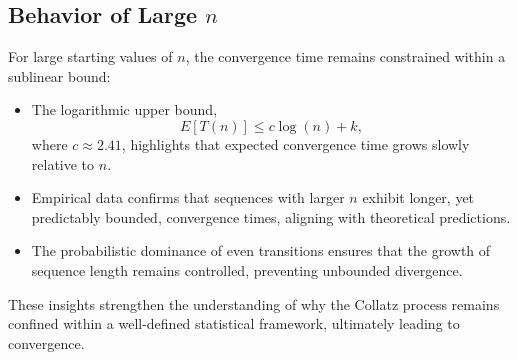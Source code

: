 \subsection{Behavior of Large \( n \)}
For large starting values of \( n \), the convergence time remains constrained within a sublinear bound:
\begin{itemize}
    \item The logarithmic upper bound,
    \[
    E[T(n)] \leq c \log(n) + k,
    \]
    where \( c \approx 2.41 \), highlights that expected convergence time grows slowly relative to \( n \).
    \item Empirical data confirms that sequences with larger \( n \) exhibit longer, yet predictably bounded, convergence times, aligning with theoretical predictions.
    \item The probabilistic dominance of even transitions ensures that the growth of sequence length remains controlled, preventing unbounded divergence.
\end{itemize}
These insights strengthen the understanding of why the Collatz process remains confined within a well-defined statistical framework, ultimately leading to convergence.


